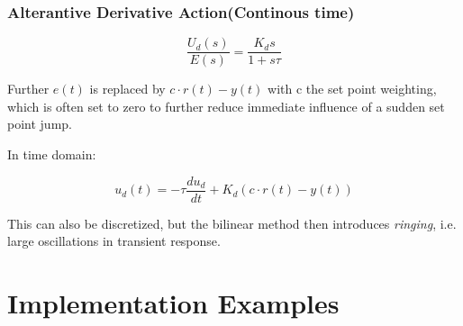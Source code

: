 \begin{frame}
	\frametitle{Alterantive Derivative Action(Continous time)}
	\begin{equation*}
		\frac{U_d(s)}{E(s)} = \frac{K_d s}{1+s\tau}
	\end{equation*}
	
	Further $e(t)$ is replaced by $c\cdot r(t)-y(t)$ with c the set point weighting, which is often set to zero to further reduce immediate influence of a sudden set point jump. 
	
	In time domain:
	
	\begin{equation*}
		u_d(t) = -\tau\frac{du_d}{dt} + K_d(c\cdot r(t)-y(t))
	\end{equation*}
	
	This can also be discretized, but the bilinear method then introduces \emph{ringing}, i.e. large oscillations in transient response.
\end{frame}

\section{Implementation Examples}

